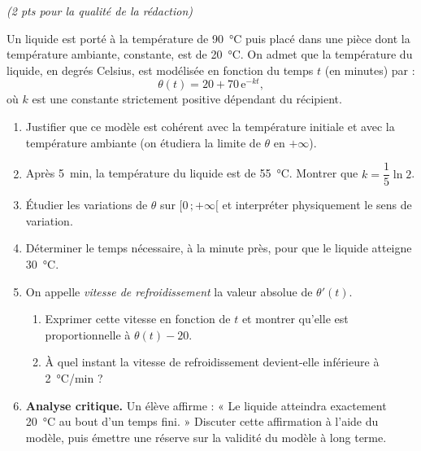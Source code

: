 \documentclass[11pt]{article}
\begin{document}
\begin{exercice}
\hfill \textit{(2 pts pour la qualité de la rédaction)}

Un liquide est porté à la température de \SI{90}{\celsius} puis placé dans une pièce dont la température ambiante, constante, est de \SI{20}{\celsius}. On admet que la température du liquide, en degrés Celsius, est modélisée en fonction du temps $t$ (en minutes) par :
\[
\theta(t) = 20 + 70\,\mathrm{e}^{-kt},
\]
où $k$ est une constante strictement positive dépendant du récipient.
\begin{enumerate}
\item Justifier que ce modèle est cohérent avec la température initiale et avec la température ambiante (on étudiera la limite de $\theta$ en $+\infty$).
\item Après \SI{5}{min}, la température du liquide est de \SI{55}{\celsius}. Montrer que $k = \dfrac{1}{5}\ln 2$.
\item Étudier les variations de $\theta$ sur $[0\,;+\infty[$ et interpréter physiquement le sens de variation.
\item Déterminer le temps nécessaire, à la minute près, pour que le liquide atteigne \SI{30}{\celsius}.
\item On appelle \emph{vitesse de refroidissement} la valeur absolue de $\theta'(t)$.
\begin{enumerate}
\item Exprimer cette vitesse en fonction de $t$ et montrer qu'elle est proportionnelle à $\theta(t) - 20$.
\item À quel instant la vitesse de refroidissement devient-elle inférieure à \SI{2}{\celsius/min} ?
\end{enumerate}
\item \textbf{Analyse critique.} Un élève affirme : « Le liquide atteindra exactement \SI{20}{\celsius} au bout d'un temps fini. » Discuter cette affirmation à l'aide du modèle, puis émettre une réserve sur la validité du modèle à long terme.
\end{enumerate}
\end{exercice}
\end{document}

